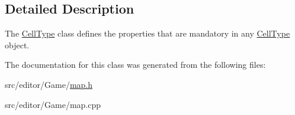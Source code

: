 \subsection{\-Detailed \-Description}
\-The \hyperlink{class_cell_type}{\-Cell\-Type} class defines the properties that are mandatory in any \hyperlink{class_cell_type}{\-Cell\-Type} object. 

\-The documentation for this class was generated from the following files\-:\begin{DoxyCompactItemize}
\item 
src/editor/\-Game/\hyperlink{map_8h}{map.\-h}\item 
src/editor/\-Game/map.\-cpp\end{DoxyCompactItemize}
